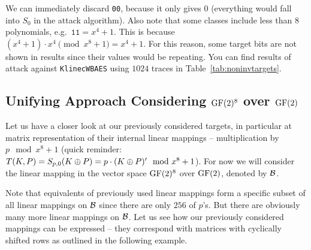 We can immediately discard {\tt 00}, because it only gives $0$ (everything would fall into $S_0$ in the attack algorithm). Also note that some classes include less than $8$ polynomials, e.g.\ $\texttt{11} = x^4+1$. This is because $(x^4+1)\cdot x^4 \pmod{x^8+1} = x^4+1$. For this reason, some target bits are not shown in results since their values would be repeating. You can find results of attack against {\tt KlinecWBAES} using $1024$ traces in Table~\ref{tab:noninvtargets}.




\subsection{Unifying Approach Considering $\mathrm{GF}(2)^8$ over $\mathrm{GF}(2)$}
\label{sec:unify}

Let us have a closer look at our previously considered targets, in particular at matrix representation of their internal linear mappings -- multiplication by $p\mod{x^8+1}$ (quick reminder: $T(K,P) = S_{p,0}(K\oplus P) = p \cdot (K\oplus P)' \mod{x^8+1}$). For now we will consider the linear mapping in the vector space $\mathrm{GF}(2)^8$ over $\mathrm{GF}(2)$, denoted by $\cal B$.

Note that equivalents of previously used linear mappings form a specific subset of all linear mappings on $\cal B$ since there are only $256$ of $p$'s. But there are obviously many more linear mappings on $\cal B$. Let us see how our previously considered mappings can be expressed -- they correspond with matrices with cyclically shifted rows as outlined in the following example.

